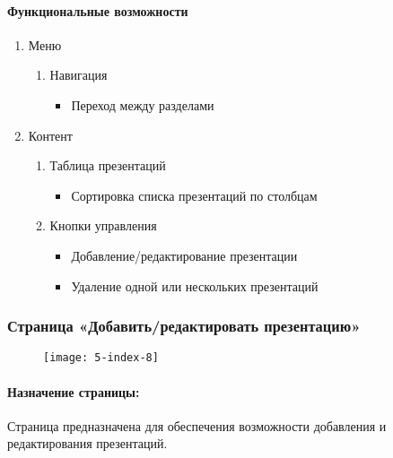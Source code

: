 \paragraph{Функциональные возможности}
\begin{enumerate}
	\item Меню
	\begin{enumerate}
		\item Навигация
		\begin{itemize}
			\item Переход между разделами
		\end{itemize}
	\end{enumerate}

	\item Контент
	\begin{enumerate}
		\item Таблица презентаций
		\begin{itemize}
			\item Сортировка списка презентаций по столбцам
		\end{itemize}

		\item Кнопки управления
		\begin{itemize}
			\item Добавление/редактирование презентации
			\item Удаление одной или нескольких презентаций
		\end{itemize}
	\end{enumerate}
\end{enumerate}


\subsubsection{Страница «Добавить/редактировать презентацию»}
\begin{figure}[H]
\texttt{[image: 5-index-8]}
\end{figure}
\paragraph{Назначение страницы:} Страница предназначена для обеспечения возможности добавления и редактирования презентаций.

